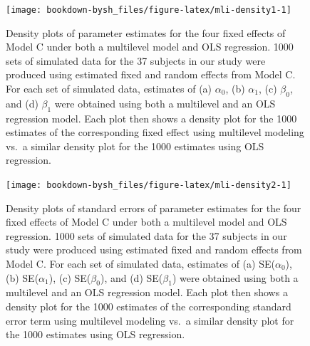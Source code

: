 \documentclass[
]{krantz}
\begin{document}
\begin{figure}

{\centering \texttt{[image: bookdown-bysh\_files/figure-latex/mli-density1-1]} 

}

\caption{Density plots of parameter estimates for the four fixed effects of Model C under both a multilevel model and OLS regression. 1000 sets of simulated data for the 37 subjects in our study were produced using estimated fixed and random effects from Model C. For each set of simulated data, estimates of (a) \(\alpha_{0}\), (b) \(\alpha_{1}\), (c) \(\beta_{0}\), and (d) \(\beta_{1}\) were obtained using both a multilevel and an OLS regression model. Each plot then shows a density plot for the 1000 estimates of the corresponding fixed effect using multilevel modeling vs.~a similar density plot for the 1000 estimates using OLS regression.}\label{fig:mli-density1}
\end{figure}



\begin{figure}

{\centering \texttt{[image: bookdown-bysh\_files/figure-latex/mli-density2-1]} 

}

\caption{Density plots of standard errors of parameter estimates for the four fixed effects of Model C under both a multilevel model and OLS regression. 1000 sets of simulated data for the 37 subjects in our study were produced using estimated fixed and random effects from Model C. For each set of simulated data, estimates of (a) SE(\(\alpha_{0}\)), (b) SE(\(\alpha_{1}\)), (c) SE(\(\beta_{0}\)), and (d) SE(\(\beta_{1}\)) were obtained using both a multilevel and an OLS regression model. Each plot then shows a density plot for the 1000 estimates of the corresponding standard error term using multilevel modeling vs.~a similar density plot for the 1000 estimates using OLS regression.}\label{fig:mli-density2}
\end{figure}
\end{document}

